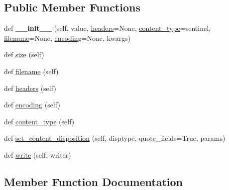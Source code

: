\subsection*{Public Member Functions}
\begin{DoxyCompactItemize}
\item 
\mbox{\label{classaiohttp_1_1payload_1_1_payload_aa1099d87bf632ec16e34ee29596b277b}} 
def {\bfseries \+\_\+\+\_\+init\+\_\+\+\_\+} (self, value, \hyperlink{classaiohttp_1_1payload_1_1_payload_a2a53edff1dc2e83f11fb952f4471426d}{headers}=None, \hyperlink{classaiohttp_1_1payload_1_1_payload_ab7f478716f0cb49905362cc8faf06ec3}{content\+\_\+type}=sentinel, \hyperlink{classaiohttp_1_1payload_1_1_payload_a2cd8854236d2ef6f3cedb3ef5e838dee}{filename}=None, \hyperlink{classaiohttp_1_1payload_1_1_payload_a32f545f68c7bf65bee28f566b35edb4e}{encoding}=None, kwargs)
\item 
def \hyperlink{classaiohttp_1_1payload_1_1_payload_a86046afc253ab3fef11df56e55248269}{size} (self)
\item 
def \hyperlink{classaiohttp_1_1payload_1_1_payload_a2cd8854236d2ef6f3cedb3ef5e838dee}{filename} (self)
\item 
def \hyperlink{classaiohttp_1_1payload_1_1_payload_a2a53edff1dc2e83f11fb952f4471426d}{headers} (self)
\item 
def \hyperlink{classaiohttp_1_1payload_1_1_payload_a32f545f68c7bf65bee28f566b35edb4e}{encoding} (self)
\item 
def \hyperlink{classaiohttp_1_1payload_1_1_payload_ab7f478716f0cb49905362cc8faf06ec3}{content\+\_\+type} (self)
\item 
def \hyperlink{classaiohttp_1_1payload_1_1_payload_a05112789187141cf733c92a339d3ac6b}{set\+\_\+content\+\_\+disposition} (self, disptype, quote\+\_\+fields=True, params)
\item 
def \hyperlink{classaiohttp_1_1payload_1_1_payload_ab20159ceaa9331365ba283028bf48da8}{write} (self, writer)
\end{DoxyCompactItemize}


\subsection{Member Function Documentation}
\mbox{\label{classaiohttp_1_1payload_1_1_payload_ab7f478716f0cb49905362cc8faf06ec3}} 
